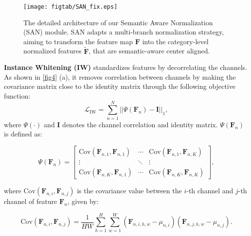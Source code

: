 \documentclass[10pt,twocolumn,letterpaper]{article}
\begin{document}
\begin{figure*}[t]
    \centering{}\vspace{-0mm}
     \texttt{[image: figtab/SAN\_fix.eps]} 
     \caption{The detailed architecture of our Semantic Aware Normalization (SAN) module. SAN adapts a multi-branch normalization strategy, aiming to transform the feature map $\mathbf{F}$ into the category-level normalized features $\widetilde{\mathbf{F}}$, that are  semantic-aware center aligned.
     }
    \label{fig3}\vspace{-4mm}
    
    \end{figure*}






\textbf{Instance Whitening (IW)} standardizes features by decorrelating the channels. As shown in \cref{fig4} (a), it removes correlation between channels by making the covariance matrix close to the identity matrix through the following objective function:
\vspace{-3mm}
\begin{equation}
\mathcal{L}_{\mathrm{IW}}=\sum_{n=1}^{N}||\Psi(\mathbf{F}_{n})-\mathbf{I}||_{1},\label{eq:4}
\end{equation}
where $\Psi(\cdot)$ and $\mathbf{I}$ denotes the channel correlation and identity matrix. $\Psi(\mathbf{F}_{n})$ is defined as:
\vspace{1mm}
\begin{footnotesize} 
\begin{equation}
\Psi(\mathbf{F}_{n})=\begin{bmatrix}\mathrm{Cov}(\mathbf{F}_{n,1},\mathbf{F}_{n,1}) & \cdots & \mathrm{Cov}(\mathbf{F}_{n,1},\mathbf{F}_{n,K})\\
\vdots & \ddots & \vdots\\
\mathrm{Cov}(\mathbf{F}_{n,K},\mathbf{F}_{n,1}) & \cdots & \mathrm{Cov}(\mathbf{F}_{n,K},\mathbf{F}_{n,K})
\end{bmatrix},
\end{equation}
\end{footnotesize}
\vspace{1mm}
where $\mathrm{Cov}(\mathbf{F}_{n,i},\mathbf{F}_{n,j})$ is the covariance value between the $i$-th channel and $j$-th channel of feature $\mathbf{F}_{n}$, given by:
\begin{footnotesize}
\begin{equation}
\mathrm{Cov}(\mathbf{F}_{n,i},\mathbf{F}_{n,j})=\frac{1}{HW}\sum_{h=1}^{H}\sum_{w=1}^{W}(\mathbf{F}_{n,i,h,w}-\mu_{n,i})(\mathbf{F}_{n,j,h,w}-\mu_{n,j}).
\end{equation}
\end{footnotesize} 
\end{document}
